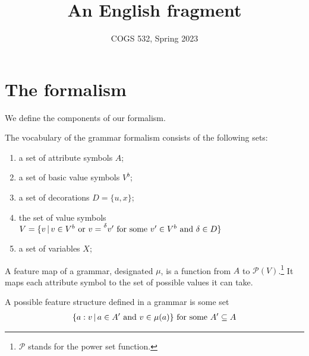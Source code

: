 \documentclass{article}
\title{An English fragment}
\author{COGS 532, Spring 2023}
\begin{document}
\maketitle


\section{The formalism}


We define the components of our formalism.

\begin{gdefinition}[Vocabulary] The vocabulary of the grammar formalism
	consists of the following sets:
	\begin{enumerate}[label=\roman*.,labelsep=.5em]
		\item a set of attribute symbols $A$;
		\item a set of basic value symbols $V^b$;
		\item a set of decorations  $D = \{u,x\}$; 
		\item the set of value symbols $V=\{v\,|\,v\in V^b \text{ or
			} v=\prescript{\delta}{}{v'} \text{ for some } v'\in V^b
		\text{ and } \delta\in D\}$
		\item a set of variables $X$;
	\end{enumerate}
\end{gdefinition}

\begin{gdefinition} A feature map of a grammar, designated $\mu$,
	is a function from $A$ to $\mathcal{P}(V)$.\footnote{$\mathcal{P}$ stands
	for the power set function.} It maps each attribute symbol to the set of
	possible values it can take.
\end{gdefinition}


\begin{gdefinition}\label{dffs}
	A possible feature structure defined in a grammar is some set
	\begin{align*}
		\{a:v\,|\,a\in A' \text{ and } v\in \mu(a)\} \text{ for some } 
		A'\subseteq A
	\end{align*}
\end{gdefinition}
\end{document}
